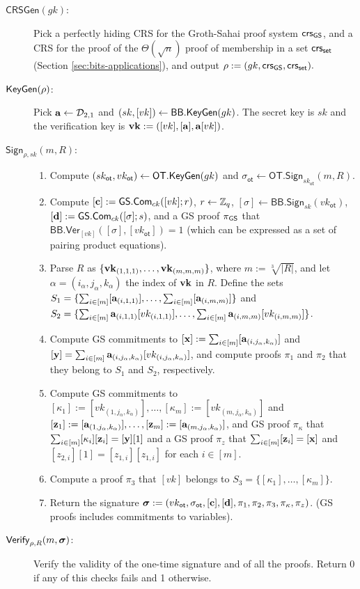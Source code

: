 \begin{description}
\item[$\mathsf{CRSGen}(gk)$:] Pick a perfectly hiding CRS for the Groth-Sahai proof system $\mathsf{crs}_{\mathsf{GS}}$, and a CRS for the proof of the $\Theta(\sqrt{n})$ proof of membership in a set $\mathsf{crs}_{\mathsf{set}}$ (Section \ref{sec:bits-applications}), and output $\rho:=(gk,\mathsf{crs}_{\mathsf{GS}},\mathsf{crs}_{\mathsf{set}}).$
\item[$\mathsf{KeyGen}(\rho)$:] Pick $\mathbf{a}\gets\mathcal{D}_{2,1}$ and $(sk,[vk])\gets\mathsf{BB}.\mathsf{KeyGen}(gk)$. The secret key is $sk$ and the verification key is $\mathbf{vk}:=([vk],[\mathbf{a}],\mathbf{a}[vk])$.
\item[$\mathsf{Sign}_{\rho,sk}(m,R)$:]
\begin{enumerate}
\item Compute $(sk_\mathsf{ot},vk_\mathsf{ot})\gets\mathsf{OT}.\mathsf{KeyGen}(gk)$ and $\sigma_\mathsf{ot}\gets\mathsf{OT}.\mathsf{Sign}_{sk_\mathsf{ot}}(m,R)$.
\item Compute $[\mathbf{c}]:={\mathsf{GS}}.\mathsf{Com}_{ck}([vk];r)$, $r\gets\mathbb{Z}_q$, $[\sigma]\gets\mathsf{BB}.\mathsf{Sign}_{sk}(vk_\mathsf{ot})$, $[\mathbf{d}]:={\mathsf{GS}}.\mathsf{Com}_{ck}([\sigma];s)$, and a GS proof $\pi_{\mathsf{GS}}$ that $\mathsf{BB}.\mathsf{Ver}_{[vk]}([\sigma],[vk_\mathsf{ot}])=1$ (which can be expressed as a set of pairing product equations).
\item Parse $R$ as $\{\mathbf{vk}_{(1,1,1)},\ldots,\mathbf{vk}_{(m,m,m)}\}$, where $m:=\sqrt[3]{|R|}$, and let $\alpha=(i_\alpha,j_\alpha,k_\alpha)$ the index of $\mathbf{vk}$ in $R$. Define the sets $S_1=\{\sum_{i\in[m]}[\mathbf{a}_{(i,1,1)}],\allowbreak\ldots,\sum_{i\in[m]}[\mathbf{a}_{(i,m,m)}]\}$ and $S_2=\{\sum_{i\in[m]}\mathbf{a}_{(i,1,1)}[vk_{(i,1,1)}],\allowbreak\ldots,\sum_{i\in[m]}\mathbf{a}_{(i,m,m)}[vk_{(i,m,m)}]\}$.
\item Compute GS commitments to $[\mathbf{x}]:=\sum_{i\in[m]}[\mathbf{a}_{(i,j_\alpha,k_\alpha)}]$ and $[\mathbf{y}]=\sum_{i\in[m]}\mathbf{a}_{(i,j_\alpha,k_\alpha)}[vk_{(i,j_\alpha,k_\alpha)}]$, and compute proofs $\pi_1$ and $\pi_2$ that they belong to $S_1$ and $S_2$, respectively.
\item Compute GS commitments to $[\kappa_1]:=[vk_{(1,j_\alpha,k_\alpha)}],\ldots,[\kappa_m]:=[vk_{(m,j_\alpha,k_\alpha)}]$ and $[\mathbf{z}_1]:=[\mathbf{a}_{(1,j_\alpha,k_\alpha)}],\ldots,[\mathbf{z}_m]:=[\mathbf{a}_{(m,j_\alpha,k_\alpha)}]$, and GS proof $\pi_\kappa$ that $\sum_{i\in[m]}[\kappa_i][\mathbf{z}_i]=[\mathbf{y}][1]$ and a GS proof $\pi_{z}$ that $\sum_{i\in[m]}[\mathbf{z}_i]=[\mathbf{x}]$ and $[z_{2,i}][1]=[z_{1,i}][z_{1,i}]$ for each $i\in[m]$.
\item Compute a proof $\pi_3$ that $[vk]$ belongs to $S_3=\{[\kappa_1],\ldots,[\kappa_m]\}$.
\item Return the signature ${\boldsymbol \sigma}:=(vk_\mathsf{ot},\sigma_\mathsf{ot},[\mathbf{c}],[\mathbf{d}],\pi_1,\pi_2,\pi_3,\pi_\kappa,\pi_z)$. (GS proofs includes commitments to variables).
\end{enumerate}
\item[$\mathsf{Verify}_{\rho,R}(m,{\boldsymbol \sigma})$:] Verify the validity of the one-time signature and of all the proofs. Return 0 if any of this checks fails and 1 otherwise.
\end{description}

